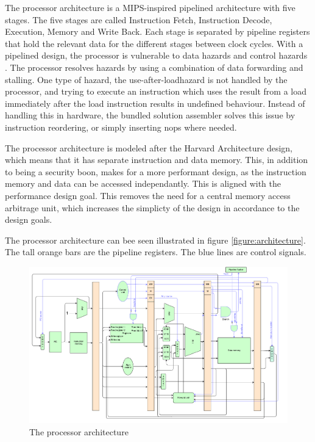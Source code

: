 The processor architecture is a MIPS-inspired pipelined architecture with five stages.
The five stages are called Instruction Fetch, Instruction Decode, Execution, Memory and Write Back.
Each stage is separated by pipeline registers that hold the relevant data for the different stages between clock cycles.
With a pipelined design, the processor is vulnerable to data hazards and control hazards .
The processor resolves hazards by using a combination of data forwarding and stalling.
One type of hazard, the use-after-load\cn hazard is not handled by the processor, and trying to execute an instruction which uses the result from a load immediately after the load instruction results in undefined behaviour.
Instead of handling this in hardware, the bundled solution assembler solves this issue by instruction reordering, or simply inserting nops where needed.

The processor architecture is modeled after the Harvard Architecture design, which means that it has separate instruction and data memory.
This, in addition to being a security boon, makes for a more performant design, as the instruction memory and data can be accessed independantly.
This is aligned with the performance design goal.
This removes the need for a central memory access arbitrage unit, which increases the simplicty of the design in accordance to the design goals\cn.

The processor architecture can bee seen illustrated in figure \vref{figure:architecture}.
The tall orange bars are the pipeline registers.
The blue lines are control signals.

\begin{figure}[H]
    \includegraphics[width=\textwidth]{illustrations/processor.pdf}
    \caption{The processor architecture}
    \label{figure:architecture}
\end{figure}



